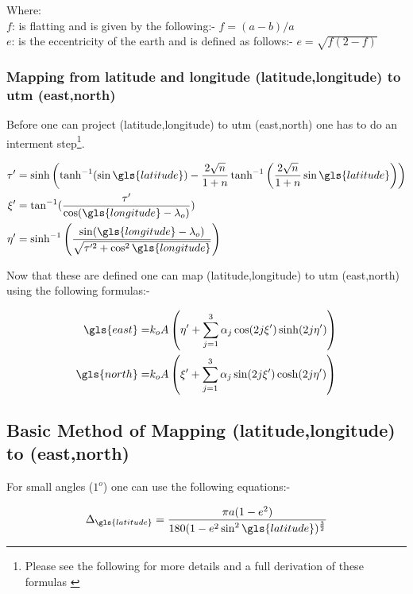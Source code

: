  Where: \\
 $f$: is flatting and is given by the following:- $f = (a-b)/a$ \\
 $e$: is the eccentricity of the earth and is defined as follows:- $e= \sqrt{f(2-f) }$\\


 \tocless\subsubsection{Mapping from latitude and longitude (\gls{latitude},\gls{longitude}) to \gls{utm} (\gls{east},\gls{north})}
Before one can project (\gls{latitude},\gls{longitude}) to \gls{utm} (\gls{east},\gls{north}) one has to do an interment step\footnote{Please see the following for more details and a full derivation of these formulas \cite{utm}}.

\begin{align}
	\tau^\prime &= \sinh \left(\tanh^{-1}(\sin\gls{latitude})- \frac{2\sqrt{n}}{1+n}\tanh^{-1}\left(\frac{2\sqrt{n}}{1+n}\sin\gls{latitude}\right) \right)\\
	\xi^\prime &= \tan^{-1}(\frac{\tau^\prime}{\cos(\gls{longitude} - \lambda_o)})\\
	\eta^\prime &= \sinh^{-1}\left(\frac{\sin(\gls{longitude}-\lambda_o)}{\sqrt{\tau^{\prime 2} + \cos^2\gls{longitude}}}\right)
\end{align}
	
Now that these are defined one can map 	 (\gls{latitude},\gls{longitude}) to \gls{utm} (\gls{east},\gls{north})  using the following formulas:-	

\begin{align}
\gls{east} =& k_oA\left(	\eta^\prime  + \sum_{j=1}^{3}\alpha_j\cos(2j\xi^\prime)\sinh(2j\eta^\prime)\right)\\
\gls{north} =& k_oA\left(	\xi^\prime  + \sum_{j=1}^{3}\alpha_j\sin(2j\xi^\prime)\cosh(2j\eta^\prime)\right)
\end{align}

   \tocless\subsection{Basic Method of Mapping  (\gls{latitude},\gls{longitude}) to (\gls{east},\gls{north})}
  For small angles ($1^o$) one can use the following equations:-
  
  \begin{equation}
  \Delta_{\gls{latitude}} = \frac{\pi a (1 - e^2)}{180(1-e^2\sin^2\gls{latitude})^{\frac{3}{2}}} \label{eq: delta latitude}
  \end{equation}
 
